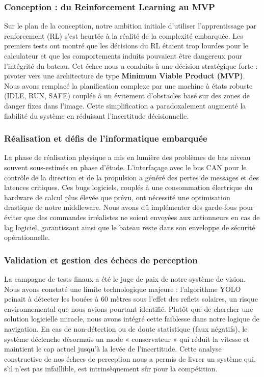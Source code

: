 \documentclass[11pt, a4paper]{article}
\begin{document}
\subsubsection{Conception : du Reinforcement Learning au MVP}
Sur le plan de la conception, notre ambition initiale d'utiliser l'apprentissage par renforcement (RL) s'est heurtée à la réalité de la complexité embarquée. Les premiers tests ont montré que les décisions du RL étaient trop lourdes pour le calculateur et que les comportements induits pouvaient être dangereux pour l'intégrité du bateau. Cet échec nous a conduits à une décision stratégique forte : pivoter vers une architecture de type \textbf{Minimum Viable Product (MVP)}. Nous avons remplacé la planification complexe par une machine à états robuste (IDLE, RUN, SAFE) couplée à un évitement d'obstacles basé sur des zones de danger fixes dans l'image. Cette simplification a paradoxalement augmenté la fiabilité du système en réduisant l'incertitude décisionnelle.

\subsubsection{Réalisation et défis de l'informatique embarquée}
La phase de réalisation physique a mis en lumière des problèmes de bas niveau souvent sous-estimés en phase d'étude. L'interfaçage avec le bus CAN pour le contrôle de la direction et de la propulsion a généré des pertes de messages et des latences critiques. Ces bugs logiciels, couplés à une consommation électrique du hardware de calcul plus élevée que prévu, ont nécessité une optimisation drastique de notre middleware. Nous avons dû implémenter des garde-fous pour éviter que des commandes irréalistes ne soient envoyées aux actionneurs en cas de lag logiciel, garantissant ainsi que le bateau reste dans son enveloppe de sécurité opérationnelle.

\subsubsection{Validation et gestion des échecs de perception}
La campagne de tests finaux a été le juge de paix de notre système de vision. Nous avons constaté une limite technologique majeure : l'algorithme YOLO peinait à détecter les bouées à 60 mètres sous l'effet des reflets solaires, un risque environnemental que nous avions pourtant identifié. Plutôt que de chercher une solution logicielle miracle, nous avons intégré cette faiblesse dans notre logique de navigation. En cas de non-détection ou de doute statistique (faux négatifs), le système déclenche désormais un mode « conservateur » qui réduit la vitesse et maintient le cap actuel jusqu'à la levée de l'incertitude. Cette analyse constructive de nos échecs de perception nous a permis de livrer un système qui, s'il n'est pas infaillible, est intrinsèquement sûr pour la compétition.
\end{document}
